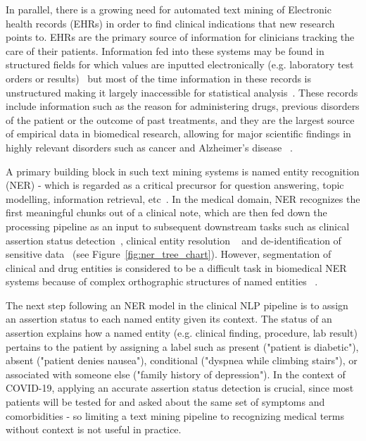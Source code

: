 \documentclass[letterpaper]{article} \usepackage{aaai21}  \usepackage{times}  \usepackage{helvet} \usepackage{courier}  \usepackage[hyphens]{url}  \usepackage{graphicx} \urlstyle{rm} \def\UrlFont{\rm}  \usepackage{natbib}  \usepackage{caption} \frenchspacing  \setlength{\pdfpagewidth}{8.5in}  \setlength{\pdfpageheight}{11in}  \usepackage{lscape}
\begin{document}
In parallel, there is a growing need for automated text mining of Electronic health records (EHRs) in order to find clinical indications that new research points to. EHRs are the primary source of information for clinicians tracking the care of their patients. Information fed into these systems may be found in structured fields for which values are inputted electronically (e.g. laboratory test orders or results)~\cite{liede2015validation} but most of the time information in these records is unstructured making it largely inaccessible for statistical analysis~\cite{murdoch2013inevitable}. These records include information such as the reason for administering drugs, previous disorders of the patient or the outcome of past treatments, and they are the largest source of empirical data in biomedical research, allowing for major scientific findings in highly relevant disorders such as cancer and Alzheimer’s disease ~\cite{perera2014factors}.

A primary building block in such text mining systems is named entity recognition (NER) - which is regarded as a critical precursor for question answering, topic modelling, information retrieval, etc~\cite{yadav2019survey}.  In the medical domain, NER recognizes the first meaningful chunks out of a clinical note, which are then fed down the processing pipeline as an input to subsequent downstream tasks such as clinical assertion status detection~\cite{uzuner20112010}, clinical entity resolution ~\cite{tzitzivacos2007international} and de-identification of sensitive data~\cite{uzuner2007evaluating} (see Figure~\ref{fig:ner_tree_chart}). However, segmentation of clinical and drug entities is considered to be a difficult task in biomedical NER systems because of complex orthographic structures of named entities ~\cite{liu2015effects}.

The next step following an NER model in the clinical NLP pipeline is to assign an assertion status to each named entity given its context. The status of an assertion explains how a named entity (e.g. clinical finding, procedure, lab result) pertains to the patient by assigning a label such as present ("patient is diabetic"), absent ("patient denies nausea"), conditional ("dyspnea while climbing stairs"), or associated with someone else ("family history of depression"). In the context of COVID-19, applying an accurate assertion status detection is crucial, since most patients will be tested for and asked about the same set of symptoms and comorbidities - so limiting a text mining pipeline to recognizing medical terms without context is not useful in practice.
\end{document}
